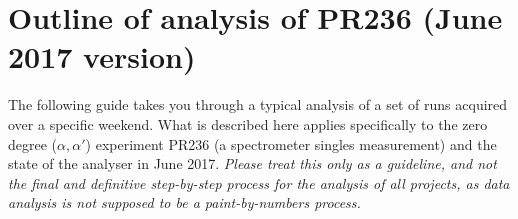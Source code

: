 \documentclass[11pt]{report}
\begin{document}
\section{Outline of analysis of PR236 (June 2017 version)}

The following guide takes you through a typical analysis of a set of runs acquired over a specific weekend.
What is described here applies specifically to the zero degree ($\alpha, \alpha '$) experiment PR236 
(a spectrometer singles measurement) and the state of the analyser in June 2017.
{\it Please treat this only as a guideline,  and not the final and definitive step-by-step process for
the analysis of all projects, as 
data analysis is not supposed to be a paint-by-numbers process.}
\end{document}
